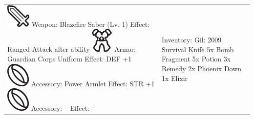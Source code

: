 \begin{tabularx}{\columnwidth}{XX}
	\noindent \newline
	\includegraphics[height=0.6\baselineskip]{./art/icons/weapon.png} Weapon: Blazefire Saber (Lv. 1) \newline 
	\indent Effect: Ranged Attack after ability \newline \newline
	\includegraphics[height=0.6\baselineskip]{./art/icons/armor.png} Armor: Guardian Corps Uniform \newline
	\indent Effect: DEF +1 \newline \newline
	\includegraphics[height=0.6\baselineskip]{./art/icons/acc.png} Accessory: Power Armlet \newline
	\indent Effect: STR +1\newline \newline
	\includegraphics[height=0.6\baselineskip]{./art/icons/acc.png} Accessory: --\newline
	\indent Effect: --\newline
	&
	\noindent \newline
	\indent Inventory: \hfill Gil: 2009 \hspace{1cm} \newline \newline
	Survival Knife \newline
	5x Bomb Fragment \newline
	5x Potion \newline
	3x Remedy \newline
	2x Phoenix Down \newline
	1x Elixir \newline
\end{tabularx}

\normalsize 
{}
\twocolumn
\clearpage